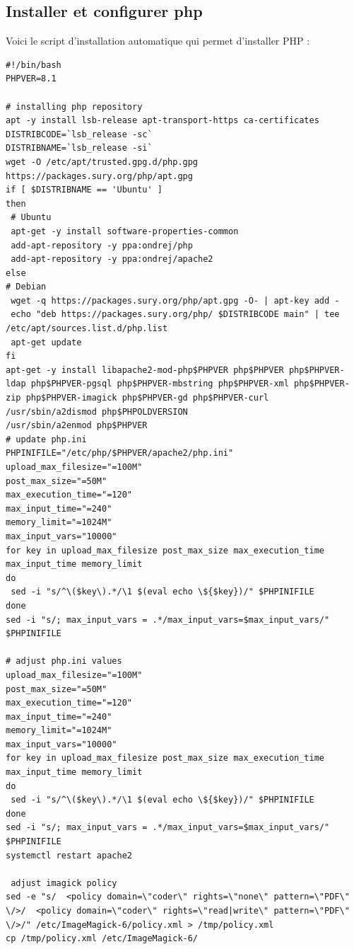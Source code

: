 \subsection{Installer et configurer php}
Voici le script d'installation automatique qui permet d'installer PHP :

\begin{lstlisting}
#!/bin/bash
PHPVER=8.1

# installing php repository
apt -y install lsb-release apt-transport-https ca-certificates
DISTRIBCODE=`lsb_release -sc`
DISTRIBNAME=`lsb_release -si`
wget -O /etc/apt/trusted.gpg.d/php.gpg https://packages.sury.org/php/apt.gpg
if [ $DISTRIBNAME == 'Ubuntu' ]
then
 # Ubuntu
 apt-get -y install software-properties-common
 add-apt-repository -y ppa:ondrej/php
 add-apt-repository -y ppa:ondrej/apache2
else
# Debian
 wget -q https://packages.sury.org/php/apt.gpg -O- | apt-key add -
 echo "deb https://packages.sury.org/php/ $DISTRIBCODE main" | tee /etc/apt/sources.list.d/php.list
 apt-get update
fi
apt-get -y install libapache2-mod-php$PHPVER php$PHPVER php$PHPVER-ldap php$PHPVER-pgsql php$PHPVER-mbstring php$PHPVER-xml php$PHPVER-zip php$PHPVER-imagick php$PHPVER-gd php$PHPVER-curl
/usr/sbin/a2dismod php$PHPOLDVERSION
/usr/sbin/a2enmod php$PHPVER
# update php.ini
PHPINIFILE="/etc/php/$PHPVER/apache2/php.ini"
upload_max_filesize="=100M"
post_max_size="=50M"
max_execution_time="=120"
max_input_time="=240"
memory_limit="=1024M"
max_input_vars="10000"
for key in upload_max_filesize post_max_size max_execution_time max_input_time memory_limit
do
 sed -i "s/^\($key\).*/\1 $(eval echo \${$key})/" $PHPINIFILE
done
sed -i "s/; max_input_vars = .*/max_input_vars=$max_input_vars/" $PHPINIFILE

# adjust php.ini values
upload_max_filesize="=100M"
post_max_size="=50M"
max_execution_time="=120"
max_input_time="=240"
memory_limit="=1024M"
max_input_vars="10000"
for key in upload_max_filesize post_max_size max_execution_time max_input_time memory_limit
do
 sed -i "s/^\($key\).*/\1 $(eval echo \${$key})/" $PHPINIFILE
done
sed -i "s/; max_input_vars = .*/max_input_vars=$max_input_vars/" $PHPINIFILE
systemctl restart apache2

 adjust imagick policy
sed -e "s/  <policy domain=\"coder\" rights=\"none\" pattern=\"PDF\" \/>/  <policy domain=\"coder\" rights=\"read|write\" pattern=\"PDF\" \/>/" /etc/ImageMagick-6/policy.xml > /tmp/policy.xml
cp /tmp/policy.xml /etc/ImageMagick-6/
\end{lstlisting}


